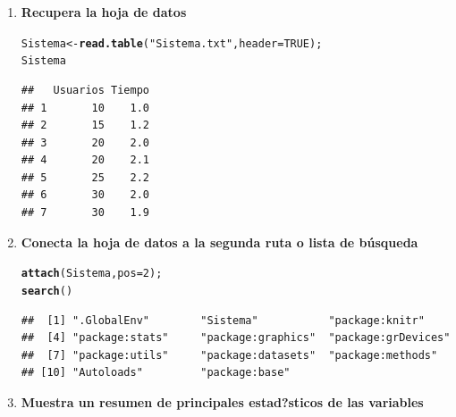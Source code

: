 \documentclass[12pt,letterpaper]{article}\usepackage[]{graphicx}\usepackage[]{color}
\makeatletter
\newcommand{\hlnum}[1]{\textcolor[rgb]{0.686,0.059,0.569}{#1}}%
\newcommand{\hlstr}[1]{\textcolor[rgb]{0.192,0.494,0.8}{#1}}%
\newcommand{\hlstd}[1]{\textcolor[rgb]{0.345,0.345,0.345}{#1}}%
\newcommand{\hlkwb}[1]{\textcolor[rgb]{0.69,0.353,0.396}{#1}}%
\newcommand{\hlkwc}[1]{\textcolor[rgb]{0.333,0.667,0.333}{#1}}%
\newcommand{\hlkwd}[1]{\textcolor[rgb]{0.737,0.353,0.396}{\textbf{#1}}}%
\newenvironment{kframe}{%
 \def\at@end@of@kframe{}%
 \ifinner\ifhmode%
  \def\at@end@of@kframe{\end{minipage}}%
  \begin{minipage}{\columnwidth}%
 \fi\fi%
 \def\FrameCommand##1{\hskip\@totalleftmargin \hskip-\fboxsep
 \colorbox{shadecolor}{##1}\hskip-\fboxsep
     \hskip-\linewidth \hskip-\@totalleftmargin \hskip\columnwidth}%
 \MakeFramed {\advance\hsize-\width
   \@totalleftmargin\z@ \linewidth\hsize
   \@setminipage}}%
 {\par\unskip\endMakeFramed%
 \at@end@of@kframe}
\newenvironment{knitrout}{}{} %
\makeatother
\begin{document}
\begin{enumerate}
\item\textbf{Recupera la hoja de datos}
  
\begin{knitrout}
\color{fgcolor}\begin{kframe}
\begin{alltt}
\hlstd{Sistema} \hlkwb{<-} \hlkwd{read.table}\hlstd{(}\hlstr{"Sistema.txt"}\hlstd{,} \hlkwc{header}\hlstd{=}\hlnum{TRUE}\hlstd{);}
\hlstd{Sistema}
\end{alltt}
\begin{verbatim}
##   Usuarios Tiempo
## 1       10    1.0
## 2       15    1.2
## 3       20    2.0
## 4       20    2.1
## 5       25    2.2
## 6       30    2.0
## 7       30    1.9
\end{verbatim}
\end{kframe}
\end{knitrout}

\item\textbf{Conecta la hoja de datos a la segunda ruta o lista de b\'usqueda}

\begin{knitrout}
\color{fgcolor}\begin{kframe}
\begin{alltt}
\hlkwd{attach}\hlstd{(Sistema,} \hlkwc{pos}\hlstd{=}\hlnum{2}\hlstd{);}
\hlkwd{search}\hlstd{()}
\end{alltt}
\begin{verbatim}
##  [1] ".GlobalEnv"        "Sistema"           "package:knitr"    
##  [4] "package:stats"     "package:graphics"  "package:grDevices"
##  [7] "package:utils"     "package:datasets"  "package:methods"  
## [10] "Autoloads"         "package:base"
\end{verbatim}
\end{kframe}
\end{knitrout}

\item\textbf{Muestra un resumen de principales estad?sticos de las variables}


\end{enumerate}
\end{document}
